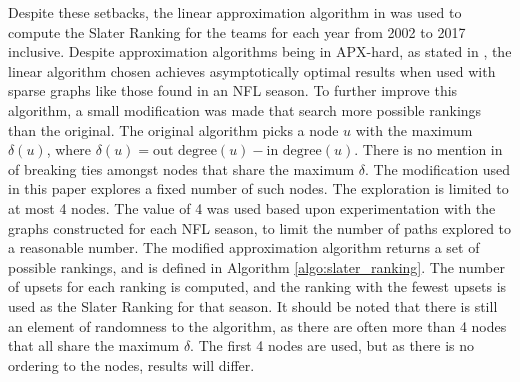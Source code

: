 \documentclass[11pt]{article}
\begin{document}
Despite these setbacks, the linear approximation algorithm in \cite{Saab2001} was used to compute the Slater Ranking for the teams for each year from 2002 to 2017 inclusive. Despite approximation algorithms being in APX-hard, as stated in \cite{Saab2001}, the linear algorithm chosen achieves asymptotically optimal results when used with sparse graphs like those found in an NFL season. To further improve this algorithm, a small modification was made that search more possible rankings than the original. The original algorithm picks a node $u$ with the maximum $\delta(u)$, where $\delta(u) = \text{out degree}(u) - \text{in degree}(u)$. There is no mention in \cite{Saab2001} of breaking ties amongst nodes that share the maximum $\delta$. The modification used in this paper explores a fixed number of such nodes. The exploration is limited to at most 4 nodes. The value of 4 was used based upon experimentation with the graphs constructed for each NFL season, to limit the number of paths explored to a reasonable number. The modified approximation algorithm returns a set of possible rankings, and is defined in Algorithm \ref{algo:slater_ranking}. The number of upsets for each ranking is computed, and the ranking with the fewest upsets is used as the Slater Ranking for that season. It should be noted that there is still an element of randomness to the algorithm, as there are often more than 4 nodes that all share the maximum $\delta$. The first 4 nodes are used, but as there is no ordering to the nodes, results will differ.
\end{document}
